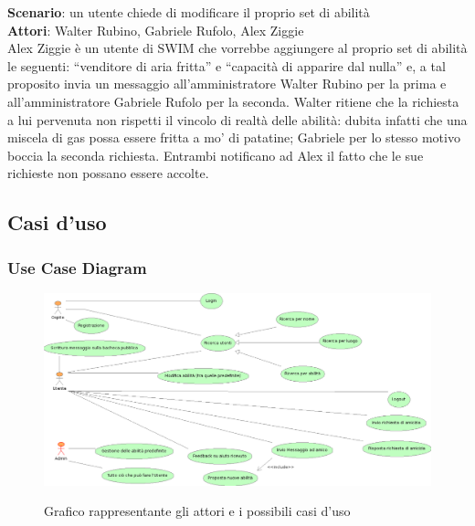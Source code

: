 \documentclass[a4paper,12pt]{article}
\begin{document}
\textbf{Scenario}: un utente chiede di modificare il proprio set di abilità \\
\textbf{Attori}: Walter Rubino, Gabriele Rufolo, Alex Ziggie \\
Alex Ziggie è un utente di SWIM che vorrebbe aggiungere al proprio set di abilità le seguenti: “venditore di aria fritta” e “capacità di apparire dal nulla” e, a tal proposito invia un messaggio all'amministratore Walter Rubino per la prima e all'amministratore Gabriele Rufolo per la seconda. Walter ritiene che la richiesta a lui pervenuta non rispetti il vincolo di realtà delle abilità: dubita infatti che una miscela di gas possa essere fritta a mo' di patatine; Gabriele per lo stesso motivo boccia la seconda richiesta. Entrambi notificano ad Alex il fatto che le sue richieste non possano essere accolte.

\subsection{Casi d'uso}
\subsubsection{Use Case Diagram}
\begin{figure} [!hbtp]
\centering
\includegraphics[scale=0.5]{UseCase.png} \\
\caption{\label{Case Diagram} Grafico rappresentante gli attori e i possibili casi d'uso}
\end{figure}
\end{document}
